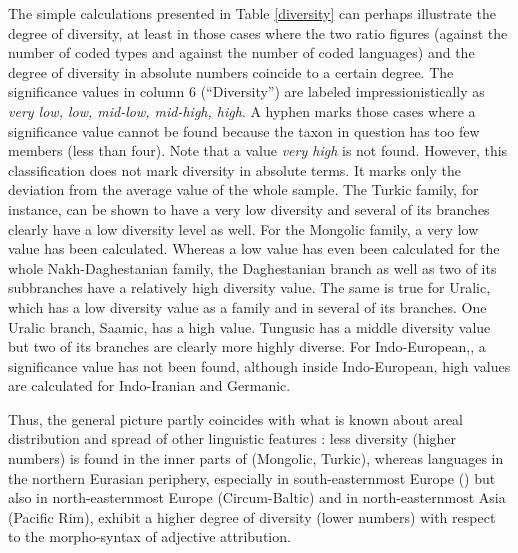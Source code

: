 The simple calculations presented in Table \ref{diversity} can perhaps illustrate the degree of diversity, at least in those cases where the two ratio figures (against the number of coded types and against the number of coded languages) and the degree of diversity in absolute numbers coincide to a certain degree. The significance values in column 6 (“Diversity”) are labeled impressionistically as \textit{very low, low, mid-low, mid-high, high}. A hyphen marks those cases where a significance value cannot be found because the taxon in question has too few members (less than four). Note that a value \textit{very high} is not found. 
 However, this classification does not mark diversity in absolute terms. It marks only the deviation from the average value of the whole sample. The Turkic family, for instance, can be shown to have a very low diversity and several of its branches clearly have a low diversity level as well. For the Mongolic family, a very low value has been calculated. Whereas a low value has even been calculated for the whole Nakh\hyp{}Daghestanian family, the Daghestanian branch as well as two of its subbranches have a relatively high diversity value. The same is true for Uralic, which has a low diversity value as a family and in several of its branches. One Uralic branch, Saamic, has a high value. Tungusic has a middle diversity value but two of its branches are clearly more highly diverse. For Indo-European,, a significance value has not been found, although inside Indo-European, high values are calculated for Indo-Iranian and Germanic.

Thus, the general picture partly coincides with what is known about areal distribution and spread of other linguistic features \citep[cf., e.g.,][]{nichols1992}: less diversity (higher numbers) is found in the inner parts of  (Mongolic, Turkic), whereas languages in the northern Eurasian periphery, especially in south\hyp{}easternmost Europe () but also in north-easternmost Europe (Circum-Baltic) and in north-easternmost Asia (Pacific Rim), exhibit a higher degree of diversity (lower numbers) with respect to the morpho-syntax of adjective attribution.

